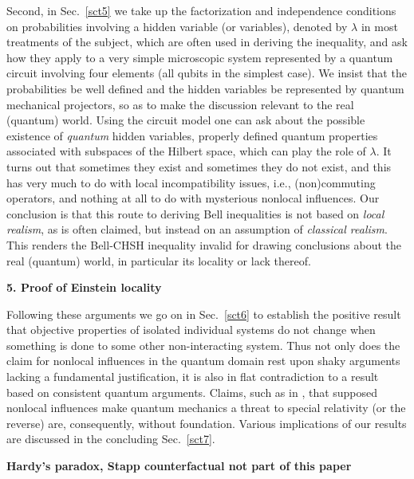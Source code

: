 \documentclass[10pt]{article} %
\def\outl#1{\par{\medskip\noindent\hspace*{.5cm}\bf
      \mathversion{bold}#1\mathversion{normal}\smallskip} }
\def\np{} \def\xa{} \def\xb{} \def\xn{} \def\xp{}
\def\outl#1{} \def\np{} \def\xa{} \def\xb{} \def\xn{} \def\xp{}
\def\outl#1{\par{\medskip\noindent\hspace*{.5cm}\bf
      \mathversion{bold}#1\mathversion{normal}\smallskip} }
\def\np{\newpage }\def\xn{\nopagebreak }\def\xp{\pagebreak }
\newcommand{\lm}{\lambda }
\begin{document}
Second, in Sec.~\ref{sct5} we take up the factorization and independence
conditions on probabilities involving a hidden variable (or variables),
denoted by $\lm$ in most treatments of the subject, which are often used in
deriving the inequality, and ask how they apply to a very simple microscopic
system represented by a quantum circuit involving four elements (all qubits in
the simplest case).  We insist that the probabilities be well defined and the
hidden variables be represented by quantum mechanical projectors, so as to
make the discussion relevant to the real (quantum) world.  Using the circuit
model one can ask about the possible existence of \emph{quantum} hidden
variables, properly defined quantum properties associated with subspaces of
the Hilbert space, which can play the role of $\lm$.  It turns out that
sometimes they exist and sometimes they do not exist, and this has very much
to do with local incompatibility issues, i.e., (non)commuting operators, and
nothing at all to do with mysterious nonlocal influences.  Our conclusion is
that this route to deriving Bell inequalities is not based on \emph{local
  realism}, as is often claimed, but instead on an assumption of
\emph{classical realism}.  This renders the Bell-CHSH inequality invalid for
drawing conclusions about the real (quantum) world, in particular its locality
or lack thereof.


\xb
\outl{5. Proof of Einstein locality}
\xa


Following these arguments we go on in Sec.~\ref{sct6} to establish the
positive result that objective properties of isolated individual systems do
not change when something is done to some other non-interacting system.  Thus
not only does the claim for nonlocal influences in the quantum domain rest
upon shaky arguments lacking a fundamental justification, it is also in flat
contradiction to a result based on consistent quantum arguments. Claims, such
as in \cite{Mdln02,AlGl09}, that supposed nonlocal influences make quantum
mechanics a threat to special relativity (or the reverse) are, consequently,
without foundation.
%
Various implications of our results are discussed in the concluding 
Sec.~\ref{sct7}.

\xb
\outl{Hardy's paradox, Stapp counterfactual not part of
  this paper}
\xa
\end{document}
